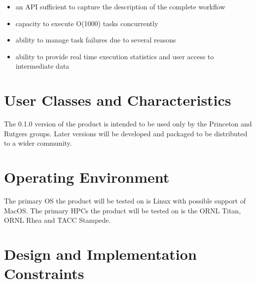 \documentclass{scrreprt}
\def\myversion{0.1.0 }
\begin{document}
\begin{itemize}[noitemsep]
\item an API sufficient to capture the description of the complete workflow
\item capacity to execute O(1000) tasks concurrently
\item ability to manage task failures due to several reasons
\item ability to provide real time execution statistics and user access to intermediate data
\end{itemize}



\section{User Classes and Characteristics}

The \myversion version of the product is intended to be used only by the Princeton and Rutgers groups. Later versions will be developed and packaged to be distributed to a wider community.

\section{Operating Environment}

The primary OS the product will be tested on is Linux with possible support of MacOS. The primary HPCs the product will be tested on is the ORNL Titan, ORNL Rhea and TACC Stampede.

\section{Design and Implementation Constraints}
\end{document}
